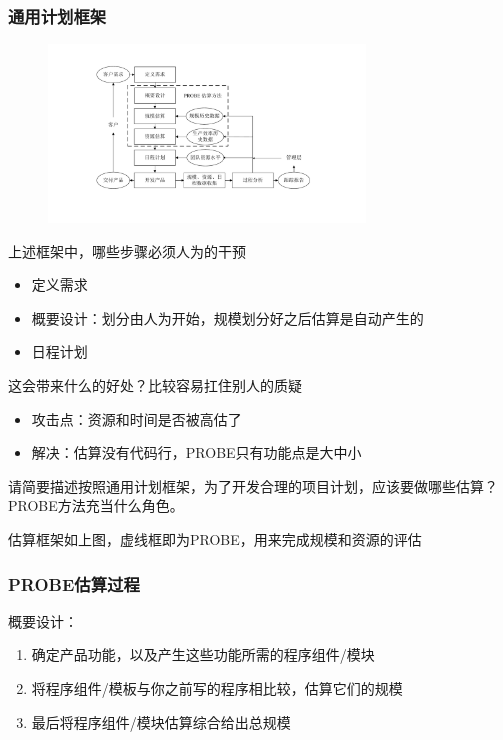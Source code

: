 \subsubsection{通用计划框架}
\begin{figure}[H]
    \vspace{-0.5em}
	\centering
	\includegraphics[width=0.75\textwidth]{images/通用计划框架.pdf}
    \vspace{-1em}
\end{figure}

上述框架中，哪些步骤必须人为的干预
\vspace{-0.8em}
\begin{multicols}{2}
    \begin{itemize}
        \item 定义需求
        \item 概要设计：划分由人为开始，规模划分好之后估算是自动产生的
        \item 日程计划
    \end{itemize}
\end{multicols}
\vspace{-1em}

这会带来什么的好处？比较容易扛住别人的质疑
\begin{itemize}
    \item 攻击点：资源和时间是否被高估了
    \item 解决：估算没有代码行，PROBE只有功能点是大中小
\end{itemize}

\begin{problem}
请简要描述按照通用计划框架，为了开发合理的项目计划，应该要做哪些估算？PROBE方法充当什么角色。

估算框架如上图，虚线框即为PROBE，用来完成规模和资源的评估
\end{problem}

\subsubsection{PROBE估算过程}
概要设计：
\vspace{-0.8em}
\begin{multicols}{2}
    \begin{enumerate}[label=\arabic*.]
        \item 确定产品功能，以及产生这些功能所需的程序组件/模块
        \item 将程序组件/模板与你之前写的程序相比较，估算它们的规模
        \item 最后将程序组件/模块估算综合给出总规模
    \end{enumerate}
\end{multicols}
\vspace{-1em}

